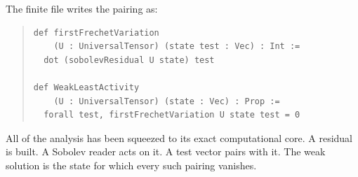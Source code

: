 The finite file writes the pairing as:

\begin{quote}\small
\begin{verbatim}
def firstFrechetVariation
    (U : UniversalTensor) (state test : Vec) : Int :=
  dot (sobolevResidual U state) test

def WeakLeastActivity
    (U : UniversalTensor) (state : Vec) : Prop :=
  forall test, firstFrechetVariation U state test = 0
\end{verbatim}
\end{quote}

All of the analysis has been squeezed to its exact computational core. A residual is built. A Sobolev reader
acts on it. A test vector pairs with it. The weak solution is the state for which every such pairing vanishes.
